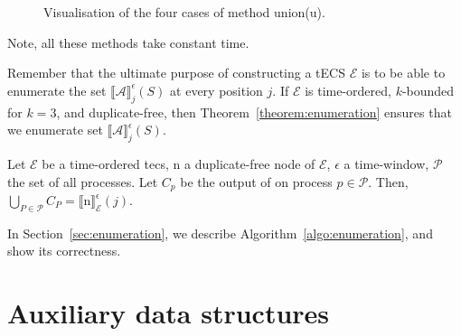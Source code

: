 \begin{figure}[t]
  \centering
  \begin{subfigure}[b]{0.15\linewidth}
    \centering
    \caption{}
    \label{fig:union:a}
  \end{subfigure}
  \hfill
  \begin{subfigure}[b]{0.15\linewidth}
    \centering
    \caption{}
    \label{fig:union:b}
  \end{subfigure}
  \hfill
  \begin{subfigure}[b]{0.3\linewidth}
    \centering
    \caption{}
    \label{fig:union:c}
  \end{subfigure}
  \hfill
  \begin{subfigure}[b]{0.3\linewidth}
    \centering
    \caption{}
    \label{fig:union:d}
  \end{subfigure}
  \caption{Visualisation of the four cases of method union(\textrm{u}).}
  \label{fig:union}
\end{figure}

Note, all these methods take constant time.

Remember that the ultimate purpose of constructing a tECS $\mathcal{E}$ is to be able to enumerate the set ${\llbracket \mathcal{A} \rrbracket}^{\epsilon}_{j}(S)$ at every position $j$. If $\mathcal{E}$ is time-ordered, $k$-bounded for $k = 3$, and duplicate-free, then Theorem~\ref{theorem:enumeration} ensures that we enumerate set ${\llbracket \mathcal{A} \rrbracket}^{\epsilon}_{j}(S)$.
\begin{theorem}\label{theorem:enumeration}
  Let $\mathcal{E}$ be a time-ordered \acrshort{tecs}, \textrm{n} a duplicate-free node of $\mathcal{E}$, $\epsilon$ a time-window, $\mathcal{P}$ the set of all processes. Let $C_{p}$ be the output of  on process $p \in \mathcal{P}$. Then, $\bigcup\limits_{P \in \mathcal{P}} C_{P} = {\llbracket \text{n} \rrbracket}^{\epsilon}_{\mathcal{E}}(j)$.
\end{theorem}

\vspace{-10pt}
In Section~\ref{sec:enumeration}, we describe Algorithm~\ref{algo:enumeration}, and show its correctness.

\section{Auxiliary data structures}\label{sec:auxiliary_data_structure}

